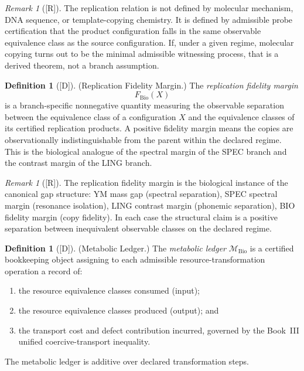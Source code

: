 \documentclass[12pt,oneside]{amsbook}
\theoremstyle{plain}
\theoremstyle{definition}
\newtheorem{definition}[theorem]{Definition}
\theoremstyle{remark}
\newtheorem{remark}[theorem]{Remark}
\newcommand{\status}[1]{\textup{[#1]}}
\begin{document}
\begin{remark}[\status{R}]\label{rem:bio-rep-remark}
The replication relation is not defined by molecular mechanism,
DNA sequence, or template-copying chemistry. It is defined by
admissible probe certification that the product configuration falls
in the same observable equivalence class as the source configuration.
If, under a given regime, molecular copying turns out to be the
minimal admissible witnessing process, that is a derived theorem, not
a branch assumption.
\end{remark}

\begin{definition}[\status{D}]\label{def:bio-fidelity-margin}
\textup{(Replication Fidelity Margin.)}
The \emph{replication fidelity margin}
\[
 F_{\mathrm{Bio}}(X)
\]
is a branch-specific nonnegative quantity measuring the observable
separation between the equivalence class of a configuration $X$ and
the equivalence classes of its certified replication products. A
positive fidelity margin means the copies are observationally
indistinguishable from the parent within the declared regime. This
is the biological analogue of the spectral margin of the SPEC branch
and the contrast margin of the LING branch.
\end{definition}

\begin{remark}[\status{R}]\label{rem:bio-fidelity-gap-analogy}
The replication fidelity margin is the biological instance of the
canonical gap structure: YM mass gap (spectral separation), SPEC
spectral margin (resonance isolation), LING contrast margin (phonemic
separation), BIO fidelity margin (copy fidelity). In each case the
structural claim is a positive separation between inequivalent
observable classes on the declared regime.
\end{remark}

\begin{definition}[\status{D}]\label{def:bio-metabolic-ledger}
\textup{(Metabolic Ledger.)}
The \emph{metabolic ledger} $\mathcal{M}_{\mathrm{Bio}}$ is a
certified bookkeeping object assigning to each admissible
resource-transformation operation a record of:
\begin{enumerate}[label=\textup{(\arabic*)}]
 \item the resource equivalence classes consumed (input);
 \item the resource equivalence classes produced (output); and
 \item the transport cost and defect contribution incurred, governed
 by the Book~III unified coercive-transport inequality.
\end{enumerate}
The metabolic ledger is additive over declared transformation steps.
\end{definition}
\end{document}
